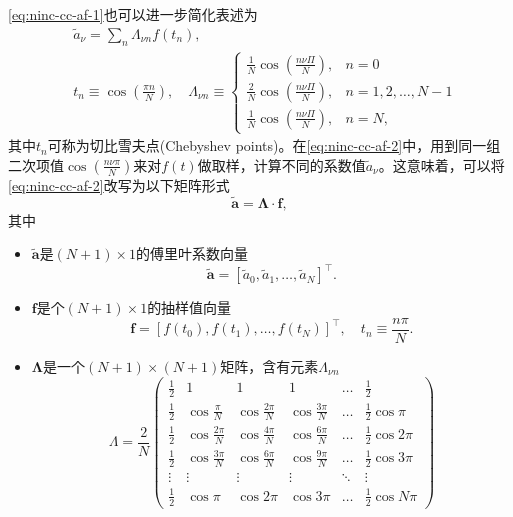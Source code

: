 \eqref{eq:ninc-cc-af-1}也可以进一步简化表述为
\begin{equation}
  \label{eq:ninc-cc-af-2}
  \begin{split}
    & \tilde{a}_{\nu}  = \sum_{n} \Lambda_{\nu n} f \left( t_{n} \right),\\
    & t_{n} \equiv \cos \left( \frac{\pi n}{N} \right), \quad \Lambda_{\nu n} \equiv \begin{cases}
    \frac{1}{N} \cos \left( \frac{n \nu \Pi}{N} \right), & n=0 \\
    \frac{2}{N} \cos \left( \frac{n \nu \Pi}{N} \right), & n=1,2,\ldots,N-1 \\
    \frac{1}{N} \cos \left( \frac{n \nu \Pi}{N} \right), & n=N,
    \end{cases}
  \end{split}
\end{equation}
其中$t_{n}$可称为切比雪夫点(Chebyshev points)。在\eqref{eq:ninc-cc-af-2}中，用到同一组二次项值$\cos \left( \frac{n \nu \pi}{N} \right)$来对$f(t)$做取样，计算不同的系数值$\tilde{a}_{\nu}$。这意味着，可以将\eqref{eq:ninc-cc-af-2}改写为以下矩阵形式
\begin{equation}
  \label{eq:ninc-cc-af-matrix}
  \tilde{\bm{a}} = \bm{\Lambda} \cdot \bm{f},
\end{equation}
其中
\begin{itemize}
  \item $\bm{\tilde{a}}$是$\left( N+1 \right) \times 1$的傅里叶系数向量
\begin{equation*}
  \bm{\tilde{a}}=\left[ \tilde{a}_{0}, \tilde{a}_{1}, \ldots, \tilde{a}_{N} \right]^{\top}.
\end{equation*}
  \item $\bm{f}$是个$\left( N+1 \right) \times 1$的抽样值向量
  \begin{equation*}
    \bm{f}=\left[ f(t_{0}), f(t_{1}), \ldots, f(t_{N}) \right]^{\top}, \quad t_{n} \equiv \frac{n \pi}{N}.
  \end{equation*}
  \item $\bm{\Lambda}$是一个$\left( N+1 \right) \times \left( N+1 \right)$矩阵，含有元素$\Lambda_{\nu n}$
  \begin{equation}
    \label{eq:ninc-cc-matrix-lambda}
    \Lambda = \frac{2}{N}
    \begin{pmatrix}
      \frac{1}{2} & 1 & 1 & 1 & \ldots & \frac{1}{2} \\
      \frac{1}{2} & \cos \frac{\pi}{N} & \cos \frac{2 \pi}{N} & \cos \frac{3 \pi}{N} & \ldots & \frac{1}{2} \cos \pi \\
      \frac{1}{2} & \cos \frac{2 \pi}{N} & \cos \frac{4 \pi}{N} & \cos \frac{6 \pi}{N} & \ldots & \frac{1}{2} \cos 2 \pi \\
      \frac{1}{2} & \cos \frac{3 \pi}{N} & \cos \frac{6 \pi}{N} & \cos \frac{9 \pi}{N} & \ldots & \frac{1}{2} \cos 3 \pi \\
      \vdots & \vdots & \vdots & \vdots & \ddots & \vdots \\
      \frac{1}{2} & \cos \pi & \cos 2 \pi & \cos 3 \pi & \ldots & \frac{1}{2} \cos N \pi
    \end{pmatrix}
  \end{equation}
\end{itemize}


